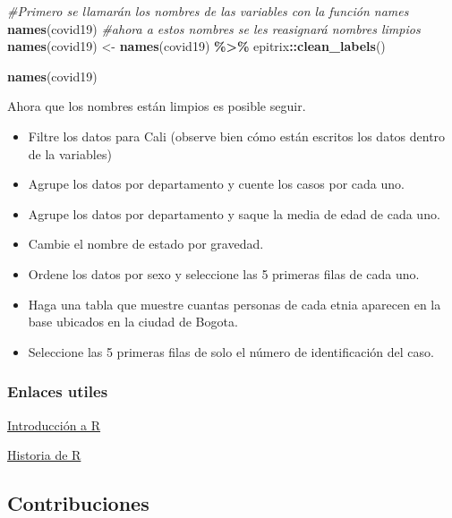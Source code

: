 \documentclass[
]{article}
\newenvironment{Shaded}{\begin{snugshade}}{\end{snugshade}}
\newcommand{\CommentTok}[1]{\textcolor[rgb]{0.56,0.35,0.01}{\textit{#1}}}
\newcommand{\FunctionTok}[1]{\textcolor[rgb]{0.13,0.29,0.53}{\textbf{#1}}}
\newcommand{\NormalTok}[1]{#1}
\newcommand{\OtherTok}[1]{\textcolor[rgb]{0.56,0.35,0.01}{#1}}
\newcommand{\SpecialCharTok}[1]{\textcolor[rgb]{0.81,0.36,0.00}{\textbf{#1}}}
\providecommand{\tightlist}{%
  \setlength{\itemsep}{0pt}\setlength{\parskip}{0pt}}
\begin{document}
\begin{Shaded}
\begin{Highlighting}[]
\CommentTok{\#Primero se llamarán los nombres de las variables con la función \textasciigrave{}names\textasciigrave{}}
\FunctionTok{names}\NormalTok{(covid19)}
\CommentTok{\#ahora a estos nombres se les reasignará nombres limpios}
\FunctionTok{names}\NormalTok{(covid19) }\OtherTok{\textless{}{-}} \FunctionTok{names}\NormalTok{(covid19) }\SpecialCharTok{\%\textgreater{}\%}\NormalTok{ epitrix}\SpecialCharTok{::}\FunctionTok{clean\_labels}\NormalTok{()}

\FunctionTok{names}\NormalTok{(covid19)}
\end{Highlighting}
\end{Shaded}

Ahora que los nombres están limpios es posible seguir.

\begin{itemize}
\tightlist
\item
  Filtre los datos para Cali (observe bien cómo están escritos los datos
  dentro de la variables)
\item
  Agrupe los datos por departamento y cuente los casos por cada uno.
\item
  Agrupe los datos por departamento y saque la media de edad de cada
  uno.
\item
  Cambie el nombre de estado por gravedad.
\item
  Ordene los datos por sexo y seleccione las 5 primeras filas de cada
  uno.
\item
  Haga una tabla que muestre cuantas personas de cada etnia aparecen en
  la base ubicados en la ciudad de Bogota.
\item
  Seleccione las 5 primeras filas de solo el número de identificación
  del caso.
\end{itemize}

\subsubsection{Enlaces utiles}\label{enlaces-utiles}

\href{http://people.umass.edu/biep640w/pdf/RStudio101\%20-\%20Introduction\%20by\%20Oscar\%20Torres-Reyna.pdf}{Introducción
a R}

\href{https://www.genbeta.com/desarrollo/introduccion-a-r-historia-de-un-lenguaje-de-computacion-para-el-analisis-de-datos}{Historia
de R}

\subsection{Contribuciones}\label{contribuciones}
\end{document}
